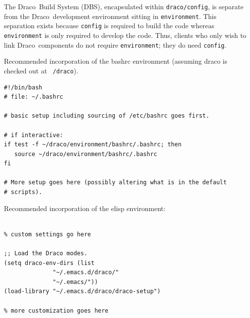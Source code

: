\documentclass[note]{ResearchNote}
\newcommand{\draco}{Draco}
\begin{document}
The \draco\ Build System (DBS), encapsulated within
\texttt{draco/config}, is separate from the \draco\ development
environment sitting in \texttt{environment}.  This separation exists
because \texttt{config} is required to build the code whereas
\texttt{environment} is only required to develop the code.  Thus,
clients who only wish to link \draco\ components do not require
\texttt{environment}; they do need \texttt{config}.

\newpage
Recommended incorporation of the bashrc environment (assuming draco is
checked out at \texttt{~/draco}).
\begin{lstlisting}[basicstyle=\footnotesize, xleftmargin=0.5in, 
  xrightmargin=0.5in]
#!/bin/bash
# file: ~/.bashrc

# basic setup including sourcing of /etc/bashrc goes first.

# if interactive:
if test -f ~/draco/environment/bashrc/.bashrc; then
   source ~/draco/environment/bashrc/.bashrc
fi

# More setup goes here (possibly altering what is in the default
# scripts). 
\end{lstlisting}

Recommended incorporation of the elisp environment:
\begin{lstlisting}[basicstyle=\footnotesize, xleftmargin=0.5in, 
  xrightmargin=0.5in]
%.emacs

% custom settings go here

;; Load the Draco modes.
(setq draco-env-dirs (list
		      "~/.emacs.d/draco/"
		      "~/.emacs/"))
(load-library "~/.emacs.d/draco/draco-setup")

% more customization goes here
\end{lstlisting}
\end{document}
